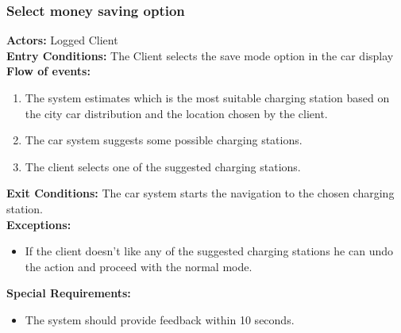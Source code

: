 \subsubsection{Select money saving option}
%
\textbf{Actors:}
Logged Client \\
%
\textbf{Entry Conditions:}
The Client selects the save mode option in the car display\\
%
\textbf{Flow of events:}
\begin{enumerate}
\item The system estimates which is the most suitable charging station based on the city car distribution and the location chosen by the client. 
\item The car system suggests some possible charging stations.
\item The client selects one of the suggested charging stations.
\end{enumerate}
%
\textbf{Exit Conditions:}
The car system starts the navigation to the chosen charging station. \\
%
\textbf{Exceptions:}
\begin{itemize}
\item If the client doesn't like any of the suggested charging stations he can undo the action and proceed with the normal mode.
\end{itemize}
%
\textbf{Special Requirements:}
\begin{itemize}
\item The system should provide feedback within 10 seconds.
\end{itemize}
